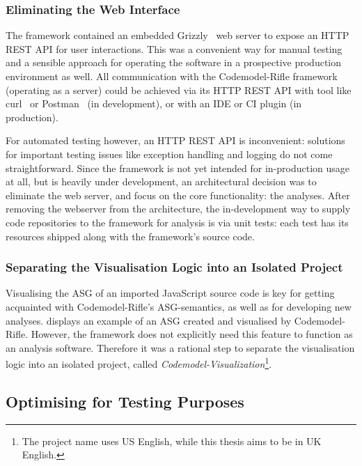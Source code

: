 \subsubsection{Eliminating the Web Interface}

The framework contained an embedded Grizzly~\cite{grizzly-website} web server to expose an HTTP REST API for user interactions. This was a convenient way for manual testing and a sensible approach for operating the software in a prospective production environment as well. All communication with the Codemodel-Rifle framework (operating as a server) could be achieved via its HTTP REST API with tool like curl~\cite{curl-website} or Postman~\cite{postman-website} (in development), or with an IDE or CI plugin (in production).

For automated testing however, an HTTP REST API is inconvenient: solutions for important testing issues like exception handling and logging do not come straightforward. Since the framework is not yet intended for in-production usage at all, but is heavily under development, an architectural decision was to eliminate the web server, and focus on the core functionality: the analyses. After removing the webserver from the architecture, the in-development way to supply code repositories to the framework for analysis is via unit tests: each test has its resources shipped along with the framework's source code.


\subsubsection{Separating the Visualisation Logic into an Isolated Project}

Visualising the ASG of an imported JavaScript source code is key for getting acquainted with Codemodel-Rifle's ASG-semantics, as well as for developing new analyses.  displays an example of an ASG created and visualised by Codemodel-Rifle. However, the framework does not explicitly need this feature to function as an analysis software. Therefore it was a rational step to separate the visualisation logic into an isolated project, called \emph{Codemodel-Visualization}\footnote{The project name uses US English, while this thesis aims to be in UK English.}.


\subsection{Optimising for Testing Purposes}

